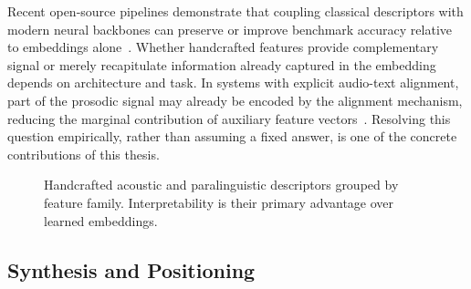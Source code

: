 Recent open-source pipelines demonstrate that coupling classical descriptors with modern neural backbones can preserve or improve benchmark accuracy relative to embeddings alone~\cite{ntampakis2025neuroxvocal}.
Whether handcrafted features provide complementary signal or merely recapitulate information already captured in the embedding depends on architecture and task.
In systems with explicit audio-text alignment, part of the prosodic signal may already be encoded by the alignment mechanism, reducing the marginal contribution of auxiliary feature vectors~\cite{ortiz2025cognialign,esteve2025speechadppa}.
Resolving this question empirically, rather than assuming a fixed answer, is one of the concrete contributions of this thesis.

\begin{figure}[H]
    \centering
    \caption[Handcrafted descriptors]{Handcrafted acoustic and paralinguistic descriptors grouped by feature family. Interpretability is their primary advantage over learned embeddings.}
    \label{fig:handcrafted_descriptors}
\end{figure}

\subsection{Synthesis and Positioning}
\label{sec:sota_synthesis}


